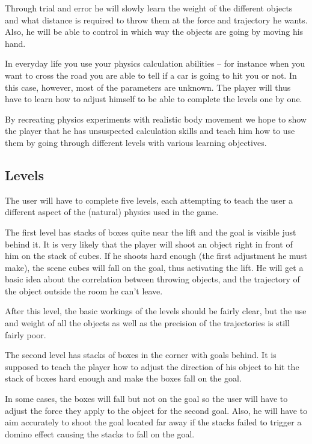 \documentclass[a4paper]{article}
\begin{document}
Through trial and error he will slowly learn the weight of the different objects
and what distance is required to throw them at the force and trajectory he
wants. Also, he will be able to control in which way the objects are going by
moving his hand.

In everyday life you use your physics calculation abilities -- for instance when
you want to cross the road you are able to tell if a car is going to hit you or
not. In this case, however, most of the parameters are unknown. The player will
thus have to learn how to adjust himself to be able to complete the levels one
by one.

By recreating physics experiments with realistic body movement we hope to show the
player that he has unsuspected calculation skills and teach him how to use them
by going through different levels with various learning objectives.


\subsection{Levels}
The user will have to complete five levels, each attempting to teach the user a
different aspect of the (natural) physics used in the game.

The first level has stacks of boxes quite near the lift and the goal is
visible just behind it. It is very likely that the player will shoot an object
right in front of him on the stack of cubes. If he shoots hard enough (the first
adjustment he must make), the scene cubes will fall on the goal, thus activating the lift.
He will get a basic idea about the correlation between throwing objects, and the
trajectory of the object outside the room he can't leave.

After this level, the basic workings of the levels should be fairly clear, but the
use and weight of all the objects as well as the precision of the trajectories is
still fairly poor.

The second level has stacks of boxes in the corner with goals behind. It is
supposed to teach the player how to adjust the direction of his object to hit the
stack of boxes hard enough and make the boxes fall on the goal.

In some cases, the boxes will fall but not on the goal so the user will have to
adjust the force they apply to the object for the second goal. Also, he will
have to aim accurately to shoot the goal located far away if the stacks failed
to trigger a domino effect causing the stacks to fall on the goal.
\end{document}
